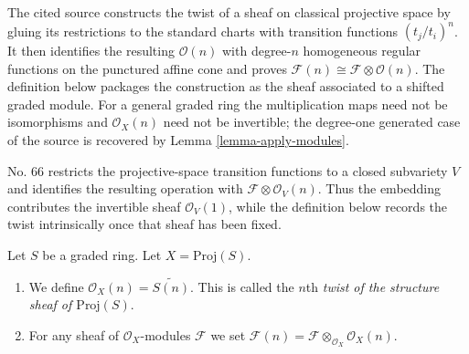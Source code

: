 \begin{definition}
\label{definition-twist}
\begin{reference}
\cite[Chapter III, \S 2, no. 54 and Propositions 1 and 2,
pp. 246--247]{FAC}
\cite[Chapter III, \S 3, no. 66, construction of $\mathcal{F}(n)$ and
final tensor formula, pp. 259--260]{FAC}
\end{reference}
\begin{history}
The cited source constructs the twist of a sheaf on classical projective
space by gluing its restrictions to the standard charts with transition
functions $(t_j/t_i)^n$. It then identifies the resulting $\mathcal{O}(n)$
with degree-$n$ homogeneous regular functions on the punctured affine cone
and proves $\mathcal{F}(n) \cong \mathcal{F} \otimes \mathcal{O}(n)$.
The definition below packages the construction as the sheaf associated to a
shifted graded module. For a general graded ring the multiplication maps need
not be isomorphisms and $\mathcal{O}_X(n)$ need not be invertible; the
degree-one generated case of the source is recovered by Lemma
\ref{lemma-apply-modules}.

No. 66 restricts the projective-space transition functions to a closed
subvariety $V$ and identifies the resulting operation with
$\mathcal{F}\otimes\mathcal{O}_V(n)$. Thus the embedding contributes the
invertible sheaf $\mathcal{O}_V(1)$, while the definition below records the
twist intrinsically once that sheaf has been fixed.
\end{history}
Let $S$ be a graded ring. Let $X = \text{Proj}(S)$.
\begin{enumerate}
\item We define $\mathcal{O}_X(n) = \widetilde{S(n)}$.
This is called the $n$th
{\it twist of the structure sheaf of $\text{Proj}(S)$}.
\item For any sheaf of $\mathcal{O}_X$-modules $\mathcal{F}$ we set
$\mathcal{F}(n) = \mathcal{F} \otimes_{\mathcal{O}_X} \mathcal{O}_X(n)$.
\end{enumerate}
\end{definition}

